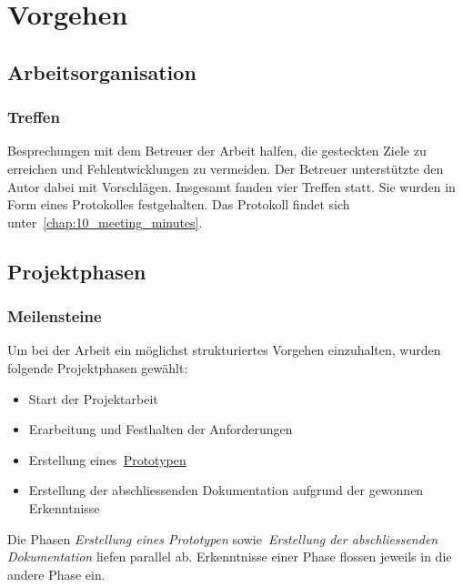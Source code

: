 
\chapter{Vorgehen}
\label{chap:procedure}

\section{Arbeitsorganisation}
\label{sec:organization}

\subsection{Treffen}
\label{subsec:meetings}

Besprechungen mit dem Betreuer der Arbeit halfen, die gesteckten Ziele zu
erreichen und Fehlentwicklungen zu vermeiden. Der Betreuer unterstützte den
Autor dabei mit Vorschlägen. Insgesamt fanden vier Treffen statt. Sie wurden in
Form eines Protokolles festgehalten. Das Protokoll findet sich
unter~\autoref{chap:10_meeting_minutes}.

\section{Projektphasen}
\label{sec:project_schedule}

\subsection{Meilensteine}
\label{subsec:milestones}

Um bei der Arbeit ein möglichst strukturiertes Vorgehen einzuhalten,
wurden folgende Projektphasen gewählt:

\begin{itemize}
    \item Start der Projektarbeit
    \item Erarbeitung und Festhalten der Anforderungen
    \item Erstellung eines~\hyperref[chap:prototype]{Prototypen}
    \item Erstellung der abschliessenden Dokumentation aufgrund der gewonnen
        Erkenntnisse
\end{itemize}

Die Phasen \textit{Erstellung eines Prototypen} sowie~\textit{Erstellung der
    abschliessenden Dokumentation} liefen parallel ab. Erkenntnisse einer Phase
flossen jeweils in die andere Phase ein.

